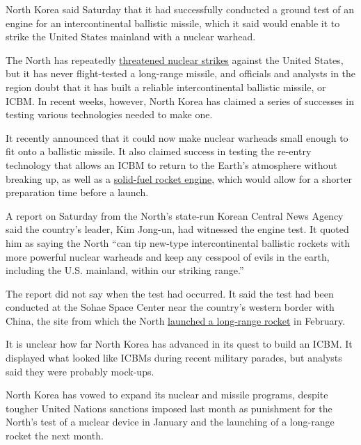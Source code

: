 North Korea said Saturday that it had successfully conducted a ground
test of an engine for an intercontinental ballistic missile, which it
said would enable it to strike the United States mainland with a nuclear
warhead.

The North has repeatedly
\href{http://www.nytimes3xbfgragh.onion/2016/03/27/world/asia/north-korea-propaganda-video-nuclear-strike.html}{threatened
nuclear strikes} against the United States, but it has never
flight-tested a long-range missile, and officials and analysts in the
region doubt that it has built a reliable intercontinental ballistic
missile, or ICBM. In recent weeks, however, North Korea has claimed a
series of successes in testing various technologies needed to make one.

It recently announced that it could now make nuclear warheads small
enough to fit onto a ballistic missile. It also claimed success in
testing the re-entry technology that allows an ICBM to return to the
Earth's atmosphere without breaking up, as well as a
\href{http://www.nytimes3xbfgragh.onion/2016/03/25/world/asia/north-korea-solid-fuel-rocket-engine.html}{solid-fuel
rocket engine}, which would allow for a shorter preparation time before
a launch.

A report on Saturday from the North's state-run Korean Central News
Agency said the country's leader, Kim Jong-un, had witnessed the engine
test. It quoted him as saying the North ``can tip new-type
intercontinental ballistic rockets with more powerful nuclear warheads
and keep any cesspool of evils in the earth, including the U.S.
mainland, within our striking range.''

The report did not say when the test had occurred. It said the test had
been conducted at the Sohae Space Center near the country's western
border with China, the site from which the North
\href{http://www.nytimes3xbfgragh.onion/2016/02/07/world/asia/north-korea-moves-up-rocket-launching-plan.html}{launched
a long-range rocket} in February.

It is unclear how far North Korea has advanced in its quest to build an
ICBM. It displayed what looked like ICBMs during recent military
parades, but analysts said they were probably mock-ups.

North Korea has vowed to expand its nuclear and missile programs,
despite tougher United Nations sanctions imposed last month as
punishment for the North's test of a nuclear device in January and the
launching of a long-range rocket the next month.

